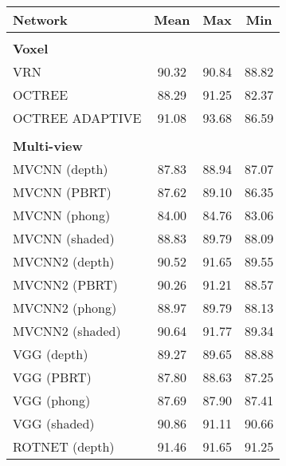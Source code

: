 \begin{table}[!h]
    \centering
	    \begin{tabular}{lccc}
	    	\hline
	    	\textbf{Network}       & \textbf{Mean} & \textbf{Max} & \textbf{Min} \\ \hline
	    	                       &               &              &              \\
	    	\textbf{Voxel }        &               &              &              \\
	    	VRN                    &     90.32     &    90.84     &    88.82     \\
	    	OCTREE                 &     88.29     &    91.25     &    82.37     \\
	    	OCTREE ADAPTIVE        &     91.08     &    93.68     &    86.59     \\ \hline
	    	                       &               &              &              \\
	    	\textbf{Multi-view }   &               &              &              \\
	    	MVCNN (depth)          &     87.83     &    88.94     &    87.07     \\
	    	MVCNN (PBRT)           &     87.62     &    89.10     &    86.35     \\
	    	MVCNN (phong)          &     84.00     &    84.76     &    83.06     \\
	    	MVCNN (shaded)         &     88.83     &    89.79     &    88.09     \\
	    	MVCNN2 (depth)         &     90.52     &    91.65     &    89.55     \\
	    	MVCNN2 (PBRT)          &     90.26     &    91.21     &    88.57     \\
	    	MVCNN2 (phong)         &     88.97     &    89.79     &    88.13     \\
	    	MVCNN2 (shaded)        &     90.64     &    91.77     &    89.34     \\
	    	VGG (depth)            &     89.27     &    89.65     &    88.88     \\
	    	VGG (PBRT)             &     87.80     &    88.63     &    87.25     \\
	    	VGG (phong)            &     87.69     &    87.90     &    87.41     \\
	    	VGG (shaded)           &     90.86     &    91.11     &    90.66     \\
	    	ROTNET (depth)         &     91.46     &    91.65     &    91.25     \\

\end{tabular}
\end{table}
